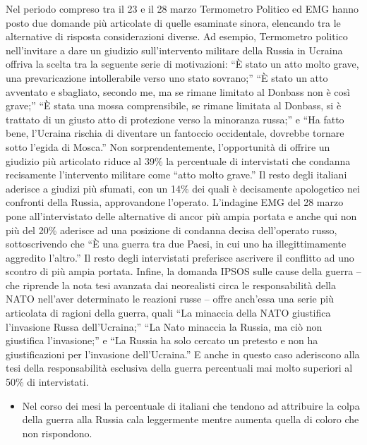 \documentclass[
]{book}
\providecommand{\tightlist}{%
  \setlength{\itemsep}{0pt}\setlength{\parskip}{0pt}}
\begin{document}
Nel periodo compreso tra il 23 e il 28 marzo Termometro Politico ed EMG hanno posto due domande più articolate di quelle esaminate sinora, elencando tra le alternative di risposta considerazioni diverse. Ad esempio, Termometro politico nell'invitare a dare un giudizio sull'intervento militare della Russia in Ucraina offriva la scelta tra la seguente serie di motivazioni: ``È stato un atto molto grave, una prevaricazione intollerabile verso uno stato sovrano;'' ``È stato un atto avventato e sbagliato, secondo me, ma se rimane limitato al Donbass non è così grave;'' ``È stata una mossa comprensibile, se rimane limitata al Donbass, si è trattato di un giusto atto di protezione verso la minoranza russa;'' e ``Ha fatto bene, l'Ucraina rischia di diventare un fantoccio occidentale, dovrebbe tornare sotto l'egida di Mosca.'' Non sorprendentemente, l'opportunità di offrire un giudizio più articolato riduce al 39\% la percentuale di intervistati che condanna recisamente l'intervento militare come ``atto molto grave.'' Il resto degli italiani aderisce a giudizi più sfumati, con un 14\% dei quali è decisamente apologetico nei confronti della Russia, approvandone l'operato. L'indagine EMG del 28 marzo pone all'intervistato delle alternative di ancor più ampia portata e anche qui non più del 20\% aderisce ad una posizione di condanna decisa dell'operato russo, sottoscrivendo che ``È una guerra tra due Paesi, in cui uno ha illegittimamente aggredito l'altro.'' Il resto degli intervistati preferisce ascrivere il conflitto ad uno scontro di più ampia portata. Infine, la domanda IPSOS sulle cause della guerra -- che riprende la nota tesi avanzata dai neorealisti circa le responsabilità della NATO nell'aver determinato le reazioni russe -- offre anch'essa una serie più articolata di ragioni della guerra, quali ``La minaccia della NATO giustifica l'invasione Russa dell'Ucraina;'' ``La Nato minaccia la Russia, ma ciò non giustifica l'invasione;'' e ``La Russia ha solo cercato un pretesto e non ha giustificazioni per l'invasione dell'Ucraina.'' E anche in questo caso aderiscono alla tesi della responsabilità esclusiva della guerra percentuali mai molto superiori al 50\% di intervistati.

\begin{itemize}
\tightlist
\item
  Nel corso dei mesi la percentuale di italiani che tendono ad attribuire la colpa della guerra alla Russia cala leggermente mentre aumenta quella di coloro che non rispondono.
\end{itemize}
\end{document}
